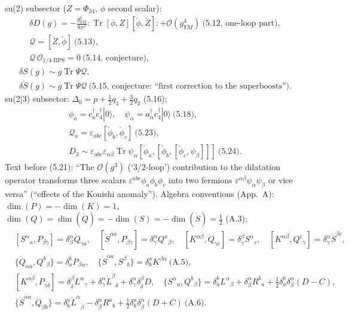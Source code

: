 \documentclass[10pt]{article}
\begin{document}
su(2) subsector ($Z=\Phi_{34}$, $\phi$ second scalar):
\begin{gather*}
\delta D(g)=-\frac{g_{YM}^2}{8\pi^2}:\operatorname{Tr}[\phi,Z][\check\phi,\check Z]:+\mathcal O(g_{YM}^4)\ \text{(5.12, one-loop part)},\\ \mathcal Q=[\check Z,\check\phi]\ \text{(5.13)},\\ \mathcal Q\,\mathcal O_{1/4\text{-BPS}}=0\ \text{(5.14, conjecture)},
\end{gather*}
\begin{gather*}
\delta S(g)\sim g\operatorname{Tr}\Psi\mathcal Q,\\ \delta\dot S(g)\sim g\operatorname{Tr}\dot\Psi\mathcal Q\ \text{(5.15, conjecture: ``first correction to the superboosts'')}.
\end{gather*}
su(2$|$3) subsector: $\Delta_0=p+\frac12q_1+\frac32q_2$ (5.16);
\begin{gather*}
\phi_a=c_a^\dagger c_4^\dagger|0\rangle,\quad \psi_\alpha=a_\alpha^\dagger c_4^\dagger|0\rangle\ \text{(5.18)},\\ \mathcal Q_a=\varepsilon_{abc}[\check\phi_b,\check\phi_c]\ \text{(5.23)},\\ D_3\sim\varepsilon_{abc}\varepsilon_{\alpha\beta}\operatorname{Tr}\psi_\alpha[\check\phi_a,[\check\phi_b,[\check\phi_c,\psi_\beta]]]\ \text{(5.24)}.
\end{gather*}
Text before (5.21): ``The $\mathcal O(g^3)$ (`3/2-loop') contribution to the dilatation operator transforms three scalars $\varepsilon^{abc}\phi_a\phi_b\phi_c$ into two fermions $\varepsilon^{\alpha\beta}\psi_\alpha\psi_\beta$ or vice versa'' (``effects of the Konishi anomaly'').
Algebra conventions (App.\ A): $\dim(P)=-\dim(K)=1$, $\dim(Q)=\dim(\dot Q)=-\dim(S)=-\dim(\dot S)=\frac12$ (A.3);
\begin{equation*}
\begin{aligned}
&[S^\alpha{}_a,P_{\beta\dot\gamma}]=\delta^\alpha_\beta\dot Q_{\dot\gamma a},\quad [\dot S^{\dot\alpha a},P_{\beta\dot\gamma}]=\delta^{\dot\alpha}_{\dot\gamma}Q^a{}_\beta,\quad [K^{\alpha\dot\beta},\dot Q_{\dot\gamma c}]=\delta^{\dot\beta}_{\dot\gamma}S^\alpha{}_c,\quad [K^{\alpha\dot\beta},Q^c{}_\gamma]=\delta^\alpha_\gamma\dot S^{\dot\beta c},\\
&\{\dot Q_{\dot\alpha a},Q^b{}_\beta\}=\delta^b_aP_{\beta\dot\alpha},\quad \{\dot S^{\dot\alpha a},S^\beta{}_b\}=\delta^a_bK^{\beta\dot\alpha}\ \text{(A.5)},\\
&[K^{\alpha\dot\beta},P_{\gamma\dot\delta}]=\delta^{\dot\beta}_{\dot\delta}L^\alpha{}_\gamma+\delta^\alpha_\gamma\dot L^{\dot\beta}{}_{\dot\delta}+\delta^\alpha_\gamma\delta^{\dot\beta}_{\dot\delta}D,\quad \{S^\alpha{}_a,Q^b{}_\beta\}=\delta^b_aL^\alpha{}_\beta+\delta^\alpha_\beta R^b{}_a+\tfrac12\delta^b_a\delta^\alpha_\beta(D-C),\\
&\{\dot S^{\dot\alpha a},\dot Q_{\dot\beta b}\}=\delta^a_b\dot L^{\dot\alpha}{}_{\dot\beta}-\delta^{\dot\alpha}_{\dot\beta}R^a{}_b+\tfrac12\delta^a_b\delta^{\dot\alpha}_{\dot\beta}(D+C)\ \text{(A.6)}.
\end{aligned}
\end{equation*}
\end{document}

